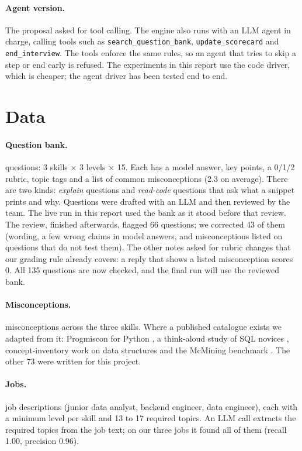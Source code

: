 \documentclass[11pt,a4paper]{article}
\begin{document}
\paragraph{Agent version.} The proposal asked for tool calling. The engine also runs with an LLM
agent in charge, calling tools such as \texttt{search\_question\_bank},
\texttt{update\_scorecard} and \texttt{end\_interview}. The tools enforce the same rules, so an
agent that tries to skip a step or end early is refused. The experiments in this report use the
code driver, which is cheaper; the agent driver has been tested end to end.

\section{Data}

\paragraph{Question bank.} \nQuestions{} questions: 3 skills $\times$ 3 levels $\times$ 15. Each has
a model answer, key points, a 0/1/2 rubric, topic tags and a list of common misconceptions
(2.3 on average). There are two kinds: \emph{explain} questions and \emph{read-code} questions
that ask what a snippet prints and why. Questions were drafted with an LLM and then reviewed by the
team. The live run in this report used the bank as it stood before that review. The review,
finished afterwards, flagged 66 questions; we corrected 43 of them (wording, a few wrong claims in
model answers, and misconceptions listed on questions that do not test them). The other notes asked
for rubric changes that our grading rule already covers: a reply that shows a listed misconception
scores 0. All 135 questions are now checked, and the final run will use the reviewed bank.

\paragraph{Misconceptions.} \nMisconceptions{} misconceptions across the three skills. Where a
published catalogue exists we adapted from it: Progmiscon for Python \cite{chiodini2021}, a
think-aloud study of SQL novices \cite{miedema2021}, concept-inventory work on data structures
\cite{karpierz2014} and the McMining benchmark \cite{alhossami2025}. The other 73 were written for
this project.

\paragraph{Jobs.} \nJobs{} job descriptions (junior data analyst, backend engineer, data engineer),
each with a minimum level per skill and 13 to 17 required topics. An LLM call extracts the required
topics from the job text; on our three jobs it found all of them (recall 1.00, precision 0.96).
\end{document}
